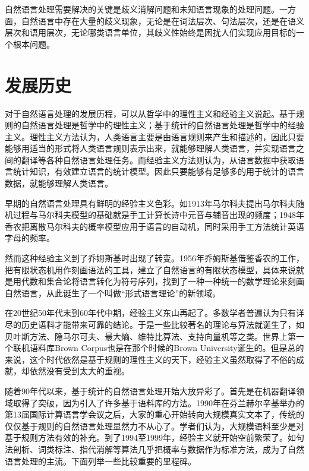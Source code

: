 自然语言处理需要解决的关键是歧义消解问题和未知语言现象的处理问题。一方面，自然语言中存在大量的歧义现象，无论是在词法层次、句法层次，还是在语义层次和语用层次，无论哪类语言单位，其歧义性始终是困扰人们实现应用目标的一个根本问题。

\section{发展历史}
对于自然语言处理的发展历程，可以从哲学中的理性主义和经验主义说起。基于规则的自然语言处理是哲学中的理性主义；基于统计的自然语言处理是哲学中的经验主义。理性主义方法认为，人类语言主要是由语言规则来产生和描述的，因此只要能够用适当的形式将人类语言规则表示出来，就能够理解人类语言，并实现语言之间的翻译等各种自然语言处理任务。而经验主义方法则认为，从语言数据中获取语言统计知识，有效建立语言的统计模型。因此只要能够有足够多的用于统计的语言数据，就能够理解人类语言。

早期的自然语言处理具有鲜明的经验主义色彩。如1913年马尔科夫提出马尔科夫随机过程与马尔科夫模型\cite{markov1913example}的基础就是手工计算长诗中元音与辅音出现的频度；1948年香农把离散马尔科夫的概率模型\cite{shannon1948mathematical}应用于语言的自动机，同时采用手工方法统计英语字母的频率。

然而这种经验主义到了乔姆斯基时出现了转变。1956年乔姆斯基\cite{chomsky1956three}借鉴香农的工作，把有限状态机用作刻画语法的工具，建立了自然语言的有限状态模型，具体来说就是用代数和集合论将语言转化为符号序列，找到了一种一种统一的数学理论来刻画自然语言，从此诞生了一个叫做“形式语言理论”的新领域。

在20世纪50年代末到60年代中期，经验主义东山再起了。多数学者普遍认为只有详尽的历史语料才能带来可靠的结论。于是一些比较著名的理论与算法就诞生了，如贝叶斯方法、隐马尔可夫\cite{stratonovich1965conditional}、最大熵\cite{jaynes1957information}、维特比算法\cite{viterbi1967error}、支持向量机\cite{}等之类。世界上第一个联机语料库Brown Corpus\cite{kuvcera1967computational}也是在那个时候的Brown University诞生的。但是总的来说，这个时代依然是基于规则的理性主义的天下，经验主义虽然取得了不俗的成就，却依然没有受到太大的重视。

随着90年代以来，基于统计的自然语言处理开始大放异彩了。首先是在机器翻译领域取得了突破，因为引入了许多基于语料库的方法。1990年在芬兰赫尔辛基举办的第13届国际计算语言学会议之后，大家的重心开始转向大规模真实文本了，传统的仅仅基于规则的自然语言处理显然力不从心了。学者们认为，大规模语料至少是对基于规则方法有效的补充。到了1994至1999年，经验主义就开始空前繁荣了。如句法剖析、词类标注、指代消解等算法几乎把概率与数据作为标准方法，成为了自然语言处理的主流。下面列举一些比较重要的里程碑。

